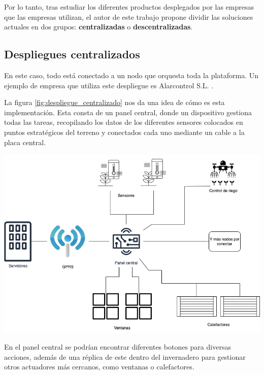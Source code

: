\clearpage

Por lo tanto, tras estudiar los diferentes productos desplegados por las empresas que las empresas utilizan, el autor de este trabajo propone dividir las soluciones actuales en dos grupos: \textbf{centralizadas} o \textbf{descentralizadas}.


\subsection{Despliegues centralizados}

En este caso, todo está conectado a un nodo que orquesta toda la plataforma.
Un ejemplo de empresa que utiliza este despliegue es Alarcontrol S.L. \cite{alarcontrol-sl}. 

La figura \ref{fig:despliegue_centralizado} nos da una idea de cómo es esta implementación. Esta consta de un panel central, donde un dispositivo gestiona todas las tareas, recopilando los datos de los diferentes sensores colocados en puntos estratégicos del terreno y conectados cada uno mediante un cable a la placa central.

\begin{center}
    \centering
    \includegraphics[width=\textwidth]{img/02-DespliegueCentralizado.png}
    \label{fig:despliegue_centralizado}
\end{center}

En el panel central se podrían encontrar diferentes botones para diversas acciones, además de una réplica de este dentro del invernadero para gestionar otros actuadores más cercanos, como ventanas o calefactores.


